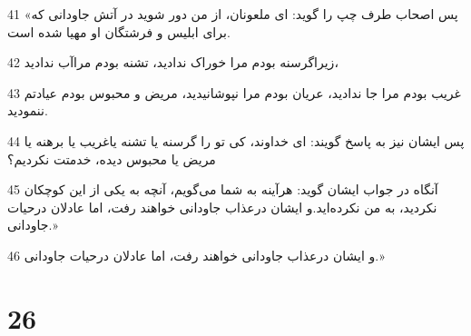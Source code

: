\par 41 «پس اصحاب طرف چپ را گوید: ای ملعونان، از من دور شوید در آتش جاودانی که برای ابلیس و فرشتگان او مهیا شده است.
\par 42 زیراگرسنه بودم مرا خوراک ندادید، تشنه بودم مراآب ندادید،
\par 43 غریب بودم مرا جا ندادید، عریان بودم مرا نپوشانیدید، مریض و محبوس بودم عیادتم ننمودید.
\par 44 پس ایشان نیز به پاسخ گویند: ای خداوند، کی تو را گرسنه یا تشنه یاغریب یا برهنه یا مریض یا محبوس دیده، خدمتت نکردیم؟
\par 45 آنگاه در جواب ایشان گوید: هرآینه به شما می‌گویم، آنچه به یکی از این کوچکان نکردید، به من نکرده‌اید.و ایشان درعذاب جاودانی خواهند رفت، اما عادلان درحیات جاودانی.»
\par 46 و ایشان درعذاب جاودانی خواهند رفت، اما عادلان درحیات جاودانی.»

\chapter{26}


